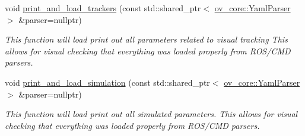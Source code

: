 \begin{DoxyCompactItemize}
void \hyperlink{structov__msckf_1_1VioManagerOptions_a88ac10c8c334619721be00810e590f4b}{print\+\_\+and\+\_\+load\+\_\+trackers} (const std\+::shared\+\_\+ptr$<$ \hyperlink{classov__core_1_1YamlParser}{ov\+\_\+core\+::\+Yaml\+Parser} $>$ \&parser=nullptr)
\begin{DoxyCompactList}\small\item\em This function will load print out all parameters related to visual tracking This allows for visual checking that everything was loaded properly from R\+O\+S/\+C\+MD parsers. \end{DoxyCompactList}\item 
void \hyperlink{structov__msckf_1_1VioManagerOptions_ac7ede3345d96f3c8c16bb5bbddcc08d0}{print\+\_\+and\+\_\+load\+\_\+simulation} (const std\+::shared\+\_\+ptr$<$ \hyperlink{classov__core_1_1YamlParser}{ov\+\_\+core\+::\+Yaml\+Parser} $>$ \&parser=nullptr)
\begin{DoxyCompactList}\small\item\em This function will load print out all simulated parameters. This allows for visual checking that everything was loaded properly from R\+O\+S/\+C\+MD parsers. \end{DoxyCompactList}\end{DoxyCompactItemize}
